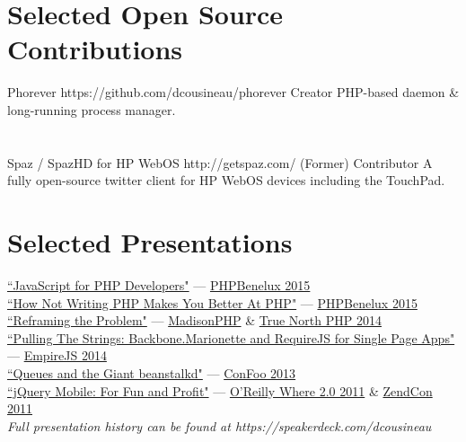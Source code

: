 \documentclass{resume}
\begin{document}
\section{Selected Open Source Contributions}

\project
	{Phorever}
	{https://github.com/dcousineau/phorever}
	{Creator}
	{PHP-based daemon \& long-running process manager.}
\\ \\ \\
\project
	{Spaz / SpazHD for HP WebOS}
	{http://getspaz.com/}
	{\small{(Former)} \normalsize{Contributor}}
	{A fully open-source twitter client for HP WebOS devices including the TouchPad.}

\section{Selected Presentations}

\begin{spacing}{1.25}
\href{https://speakerdeck.com/dcousineau/javascript-for-php-developers}{``JavaScript for PHP Developers"} --- \href{https://conference.phpbenelux.eu/2015/}{PHPBenelux 2015}\\
\href{https://speakerdeck.com/dcousineau/how-not-writing-php-makes-you-better-at-php}{``How Not Writing PHP Makes You Better At PHP"} --- \href{https://conference.phpbenelux.eu/2015/}{PHPBenelux 2015}\\
\href{https://speakerdeck.com/dcousineau/reframing-the-problem-truenorthphp-2014}{``Reframing the Problem"} --- \href{http://2014.madisonphpconference.com/schedule/view/19/reframing-the-problem-daniel-cousineau}{MadisonPHP} \& \href{http://truenorthphp.ca/}{True North PHP 2014}\\
\href{https://speakerdeck.com/dcousineau/pulling-the-strings-backbone-dot-marionette-and-require-dot-js-for-single-page-apps}{``Pulling The Strings: Backbone.Marionette and RequireJS for Single Page Apps"} --- \href{http://2014.empirejs.org/#/speakers}{EmpireJS 2014}\\
\href{https://speakerdeck.com/dcousineau/queues-and-the-giant-beanstalkd}{``Queues and the Giant beanstalkd"} --- \href{http://confoo.ca/}{ConFoo 2013}\\
\href{http://www.slideshare.net/eljefe/jquery-mobile-for-fun-and-profit}{``jQuery Mobile: For Fun and Profit"} --- \href{http://whereconf.com/where2011/public/schedule/speaker/110352}{O'Reilly Where 2.0 2011} \& \href{http://zendcon.com/2011/speaker/#4054}{ZendCon 2011}\\
\emph{Full presentation history can be found at https://speakerdeck.com/dcousineau}
\end{spacing}
\end{document}
